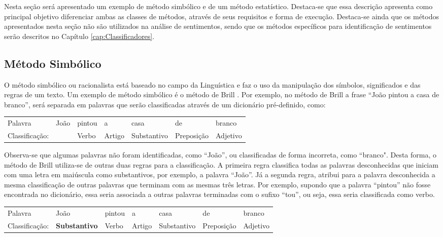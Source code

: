 Nesta seção será apresentado um exemplo de método simbólico e de um método
estatístico.
Destaca-se que essa descrição apresenta como principal objetivo
diferenciar ambas as classes de métodos, através de seus requisitos e forma de execução.
Destaca-se ainda que os métodos apresentados nesta seção não são utilizados na
análise de sentimentos, sendo que os métodos específicos para
identificação de sentimentos serão descritos no Capítulo \ref{cap:Classificadores}.


\subsection{Método Simbólico}
O método simbólico ou racionalista está
baseado no campo da Linguística e faz o uso da manipulação dos símbolos,
significados e das regras de um texto. Um exemplo de método simbólico é o
método de Brill \cite{Brill:1992:SRP:974499.974526}. Por exemplo, no método de
Brill a frase ``João pintou a casa de branco'', será separada em palavras que
serão classificadas através de um dicionário pré-definido, como:

\begin{table}[htb]
\centering
\begin{tabular}{l|l|l|l|l|l|l}
Palavra         & João        & pintou & a      & casa        & de
& branco
\\
Classificação:   & 			   & Verbo  & Artigo & Substantivo & Preposição & Adjetivo
\end{tabular}
\label{my-label}
\end{table}

Observa-se que algumas palavras não foram
identificadas, como ``João'', ou classificadas de forma incorreta, como
``branco". Desta forma, o método de Brill utiliza-se de outras duas regras para
a classificação.
A primeira regra classifica todas as palavras desconhecidas que iniciam com uma
letra em maiúscula como substantivos, por exemplo, a palavra ``João''. Já a
segunda regra, atribui para a palavra desconhecida a mesma classificação de outras palavras que terminam com as mesmas três letras. Por exemplo, supondo
que a palavra ``pintou'' não fosse encontrada no dicionário, essa seria
associada a outras palavras terminadas com o sufixo ``tou'', ou seja, essa seria
classificada como verbo.

\begin{table}[htb]
\centering
\begin{tabular}{l|l|l|l|l|l|l}
Palavra         & João        & pintou & a      & casa        & de
& branco
\\
Classificação:   & \textbf{Substantivo} & Verbo  & Artigo & Substantivo &
Preposição & Adjetivo
\end{tabular}
\label{my-label}
\end{table}



